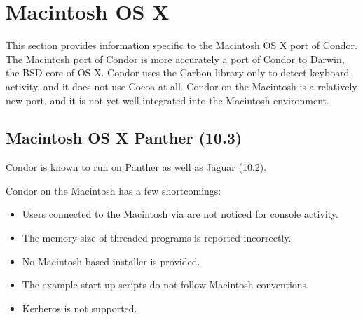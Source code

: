 \section{\label{sec:platform-linux}Macintosh OS X}

This section provides information specific to the Macintosh OS X port of
Condor.
The Macintosh port of Condor is more accurately a port of Condor to
Darwin, the BSD core of OS X. Condor uses the Carbon library only to
detect keyboard activity, and it does not use Cocoa at all.
Condor on the Macintosh is a relatively new port, and it 
is not yet well-integrated
into the Macintosh environment. 
\subsection{\label{sec:platform-macos-panther}Macintosh OS X Panther (10.3)}

Condor \VersionNotice
is known to run on Panther as well
as Jaguar (10.2). 

Condor on the Macintosh has a few shortcomings:
\begin{itemize}
\item Users connected to the Macintosh via  are not
noticed for console activity.
\item The memory size of threaded programs is reported incorrectly.
\item No Macintosh-based installer is provided.
\item The example start up scripts do not follow Macintosh conventions.
\item Kerberos is not supported.
\end{itemize}

